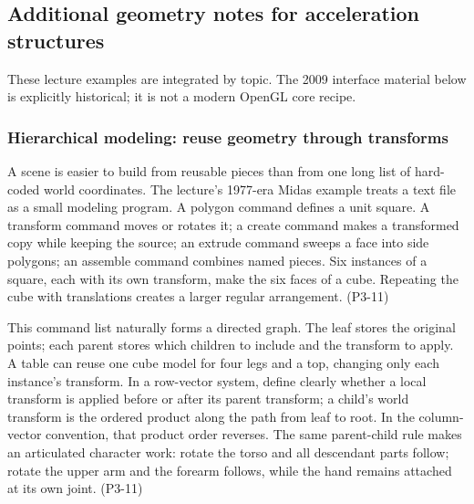 \subsection{Additional geometry notes for acceleration structures}\label{04-visual-computing-ii-ch029-additional-geometry-notes-for-acceleration-structures}

\hypertarget{04-visual-computing-ii-ch029-additional-geometry-notes-for-acceleration-structures}{}

These lecture examples are integrated by topic. The 2009 interface material below is explicitly historical; it is not a modern OpenGL core recipe.

\subsubsection{Hierarchical modeling: reuse geometry through transforms}\label{04-visual-computing-ii-ch029-hierarchical-modeling-reuse-geometry-through-transforms}

\hypertarget{04-visual-computing-ii-ch029-hierarchical-modeling-reuse-geometry-through-transforms}{}

A scene is easier to build from reusable pieces than from one long list of hard-coded world coordinates. The lecture's 1977-era Midas example treats a text file as a small modeling program. A polygon command defines a unit square. A transform command moves or rotates it; a create command makes a transformed copy while keeping the source; an extrude command sweeps a face into side polygons; an assemble command combines named pieces. Six instances of a square, each with its own transform, make the six faces of a cube. Repeating the cube with translations creates a larger regular arrangement. (P3-11)

This command list naturally forms a directed graph. The leaf stores the original points; each parent stores which children to include and the transform to apply. A table can reuse one cube model for four legs and a top, changing only each instance's transform. In a row-vector system, define clearly whether a local transform is applied before or after its parent transform; a child's world transform is the ordered product along the path from leaf to root. In the column-vector convention, that product order reverses. The same parent-child rule makes an articulated character work: rotate the torso and all descendant parts follow; rotate the upper arm and the forearm follows, while the hand remains attached at its own joint. (P3-11)

